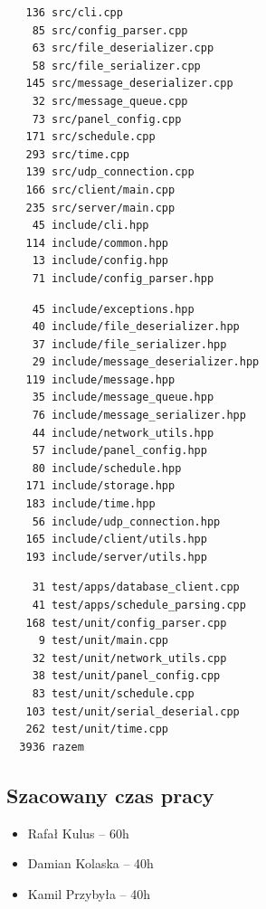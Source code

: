 \documentclass[12pt, a4paper]{article}
\begin{document}
\begin{minipage}{0,45\textwidth}
\begin{verbatim}
   136 src/cli.cpp
    85 src/config_parser.cpp
    63 src/file_deserializer.cpp
    58 src/file_serializer.cpp
   145 src/message_deserializer.cpp
    32 src/message_queue.cpp
    73 src/panel_config.cpp
   171 src/schedule.cpp
   293 src/time.cpp
   139 src/udp_connection.cpp
   166 src/client/main.cpp
   235 src/server/main.cpp
    45 include/cli.hpp
   114 include/common.hpp
    13 include/config.hpp
    71 include/config_parser.hpp
\end{verbatim}
\end{minipage}
\hfill
\begin{minipage}{0,45\textwidth}
\begin{verbatim}
    45 include/exceptions.hpp
    40 include/file_deserializer.hpp
    37 include/file_serializer.hpp
    29 include/message_deserializer.hpp
   119 include/message.hpp
    35 include/message_queue.hpp
    76 include/message_serializer.hpp
    44 include/network_utils.hpp
    57 include/panel_config.hpp
    80 include/schedule.hpp
   171 include/storage.hpp
   183 include/time.hpp
    56 include/udp_connection.hpp
   165 include/client/utils.hpp
   193 include/server/utils.hpp
\end{verbatim}
\end{minipage}

\begin{verbatim}
    31 test/apps/database_client.cpp
    41 test/apps/schedule_parsing.cpp
   168 test/unit/config_parser.cpp
     9 test/unit/main.cpp
    32 test/unit/network_utils.cpp
    38 test/unit/panel_config.cpp
    83 test/unit/schedule.cpp
   103 test/unit/serial_deserial.cpp
   262 test/unit/time.cpp
  3936 razem
\end{verbatim}

\hypertarget{czas-pracy}{%
\subsection{Szacowany czas pracy}\label{czas-pracy}}

\begin{itemize}
\item Rafał Kulus -- 60h
\item Damian Kolaska -- 40h
\item Kamil Przybyła -- 40h
\end{itemize}
\end{document}
